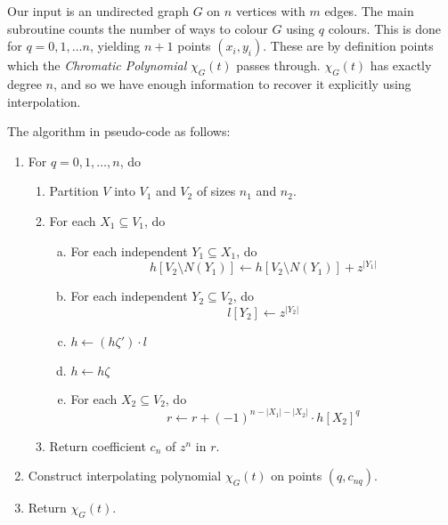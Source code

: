 \documentclass[a4paper]{article}
\begin{document}

Our input is an undirected graph $G$ on $n$ vertices with $m$ edges\footnotemark. The main subroutine counts the number of ways to colour $G$ using $q$ colours. This is done for $q = 0, 1, \ldots n$, yielding $n + 1$ points $(x_i, y_i)$. These are by definition points which the \emph{Chromatic Polynomial} $\chi_G(t)$ passes through. $\chi_G(t)$ has exactly degree $n$, and so we have enough information to recover it explicitly using interpolation.


The algorithm in pseudo-code as follows:

\begin{enumerate}[{Step} A.]
 \item \label{q} For $q = 0, 1, \ldots, n$, do
 \begin{enumerate}[1.]
  \item Partition $V$ into $V_1$ and $V_2$ of sizes $n_1$ and $n_2$.
  \item \label{step1} For each $X_1 \subseteq V_1$, do
  \begin{enumerate}[a)]
   \item \label{indep1} For each independent $Y_1 \subseteq X_1$, do
$$ h[V_2 \setminus N(Y_1)] \leftarrow h[V_2 \setminus N(Y_1)] + z^{|Y_1|} $$
   \item \label{indep2} For each independent $Y_2 \subseteq V_2$, do
$$ l[Y_2] \leftarrow z^{|Y_2|} $$
   \item $h \leftarrow (h\zeta')\cdot l$
   \item $h \leftarrow h\zeta$
   \item \label{rstep}For each $X_2 \subseteq V_2$, do
$$ r \leftarrow r + (-1)^{n - |X_1| - |X_2|}\cdot h[X_2]^q $$
  \end{enumerate}
  \item Return coefficient $c_n$ of $z^n$ in $r$.
 \end{enumerate}
 \item Construct interpolating polynomial $\chi_G(t)$ on points $(q, c_{nq})$.
 \item Return $\chi_G(t)$.
\end{enumerate}
\end{document}
